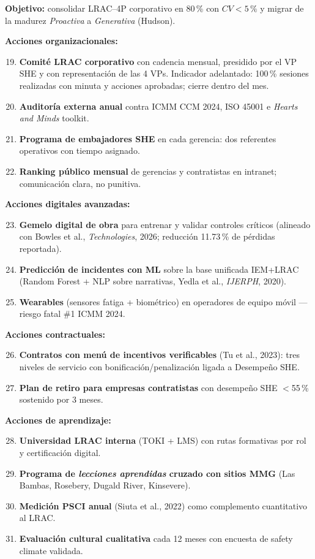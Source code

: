 \documentclass[12pt,a4paper]{article}
\begin{document}
\begin{kbox}
\textbf{Objetivo:} consolidar LRAC--4P corporativo en 80\,\% con $CV<5\,\%$ y migrar de la madurez \emph{Proactiva} a \emph{Generativa} (Hudson).
\end{kbox}

\textbf{Acciones organizacionales:}
\begin{enumerate}\setcounter{enumi}{18}
\item \textbf{Comité LRAC corporativo} con cadencia mensual, presidido por el VP SHE y con representación de las 4 VPs. Indicador adelantado: 100\,\% sesiones realizadas con minuta y acciones aprobadas; cierre dentro del mes.
\item \textbf{Auditoría externa anual} contra ICMM CCM 2024, ISO 45001 e \emph{Hearts and Minds} toolkit.
\item \textbf{Programa de embajadores SHE} en cada gerencia: dos referentes operativos con tiempo asignado.
\item \textbf{Ranking público mensual} de gerencias y contratistas en intranet; comunicación clara, no punitiva.
\end{enumerate}

\textbf{Acciones digitales avanzadas:}
\begin{enumerate}\setcounter{enumi}{22}
\item \textbf{Gemelo digital de obra} para entrenar y validar controles críticos (alineado con Bowles et al., \emph{Technologies}, 2026; reducción 11.73\,\% de pérdidas reportada).
\item \textbf{Predicción de incidentes con ML} sobre la base unificada IEM+LRAC (Random Forest + NLP sobre narrativas, Yedla et al., \emph{IJERPH}, 2020).
\item \textbf{Wearables} (sensores fatiga + biométrico) en operadores de equipo móvil --- riesgo fatal \#1 ICMM 2024.
\end{enumerate}

\textbf{Acciones contractuales:}
\begin{enumerate}\setcounter{enumi}{25}
\item \textbf{Contratos con menú de incentivos verificables} (Tu et al., 2023): tres niveles de servicio con bonificación/penalización ligada a Desempeño SHE.
\item \textbf{Plan de retiro para empresas contratistas} con desempeño SHE $<$55\,\% sostenido por 3 meses.
\end{enumerate}

\textbf{Acciones de aprendizaje:}
\begin{enumerate}\setcounter{enumi}{27}
\item \textbf{Universidad LRAC interna} (TOKI + LMS) con rutas formativas por rol y certificación digital.
\item \textbf{Programa de \emph{lecciones aprendidas} cruzado con sitios MMG} (Las Bambas, Rosebery, Dugald River, Kinsevere).
\item \textbf{Medición PSCI anual} (Siuta et al., 2022) como complemento cuantitativo al LRAC.
\item \textbf{Evaluación cultural cualitativa} cada 12 meses con encuesta de safety climate validada.
\end{enumerate}
\end{document}
